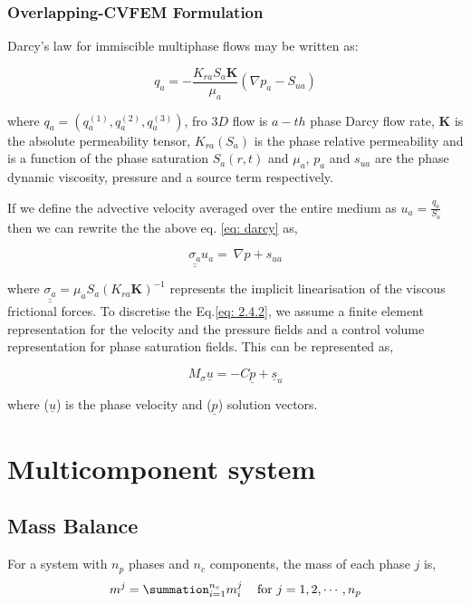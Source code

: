 \documentclass[12pt,a4paper,oneside]{report}%
\begin{document}
\subsubsection{Overlapping-CVFEM Formulation}

Darcy's law for immiscible multiphase flows may be written as:

\begin{equation}
q_a = - \frac{K_{ra} S_a \textbf{K}}{\mu_a} (\nabla p_a - S_{ua})
\label{eq: darcy}
\end{equation}

\noindent where $q_a = (q^{(1)}_a, q^{(2)}_a,q^{(3)}_a)$, fro $3D$ flow is $a-th$ phase Darcy flow rate, \textbf{K} is the absolute permeability tensor, $K_{ra} (S_a)$ is the phase relative permeability and is a function of the phase saturation $S_a(r,t)$ and $\mu_a$, $p_a$ and $s_{ua}$ are the phase dynamic viscosity, pressure and a source term respectively.
 
 If we define the advective velocity averaged over the entire medium as $u_a= \frac{q_a}{S_a}$ then we can rewrite the the above eq. \ref{eq: darcy} as, 
 
\begin{equation}
\underline{\underline{\sigma_a}} u_a = \ \nabla p + s_{ua}
\label{eq: 2.4.2}
\end{equation}   

\noindent where  $\underline{\underline{\sigma_a}} = \mu_a S_a {(K_{ra} \textbf{K})^{-1}}$ represents the implicit linearisation of the viscous frictional forces. To discretise the Eq.\ref{eq: 2.4.2}, we assume a finite element representation for the velocity and the pressure fields and a control volume representation for phase saturation fields. This can be represented as, 

\begin{equation}
M_{\sigma} \underline{u} = -C \underline{p} + {\underline{s}_u}
\end{equation} 

\noindent where ($\underline{u}$) is the phase velocity and ($\underline{p}$) solution vectors.  

\pagebreak

\section{Multicomponent system}

\subsection{Mass Balance}
For a system with $n_{p}$ phases and $n_{c}$ components, the mass of each phase $j$ is,
\begin{equation}
m^{j} = \summation_{i=1}^{n_{c}}m_{i}^{j}\;\;\;\text{ for }j=1,2,\cdots,n_{p}
\label{Eqn_MassBalance_Phase}
\end{equation}
\end{document}
